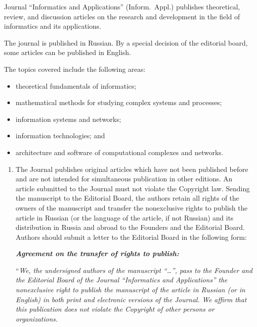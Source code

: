 {\small

\noindent
Journal ``Informatics and Applications'' (Inform.\ Appl.)
publishes theoretical, review, and discussion
articles on the research and development in the
field of informatics and its applications.

The journal is published in Russian.
By a special decision of the editorial
board, some articles can be published in English.


The topics covered include the following areas:
\begin{itemize}
               \item
     theoretical fundamentals of informatics; \\[-14pt]
\item
mathematical methods for studying complex systems and processes; \\[-14pt]
\item
information systems and networks;\\[-14pt]
\item
information technologies; and \\[-14pt]
\item
architecture and software of computational complexes and networks. \\[-14pt]
\end{itemize}

\noindent
\begin{enumerate}[1.]
\item The Journal publishes original articles which have not been published before and are not
intended for simultaneous publication in other editions. An article submitted to the Journal must not violate the
Copyright law. Sending the manuscript to the Editorial Board, the authors retain all rights of the
owners of the manuscript and transfer the nonexclusive rights to publish the article in Russian
(or the language of the article, if not Russian) and its distribution in Russia and abroad to the
Founders and the Editorial Board. Authors should submit a letter to the Editorial Board in the
following form:

{\bfseries\textit{Agreement on the transfer of rights to publish:}}

``\textit{We, the undersigned authors of the manuscript ``\ldots'', pass to the
Founder and the Editorial Board of the Journal ``Informatics and Applications''
the nonexclusive right to publish the manuscript of the article in Russian (or
in English) in both print and electronic versions of the Journal. We affirm
that this publication does not violate the Copyright of other persons or
organizations.}


\end{enumerate}}

